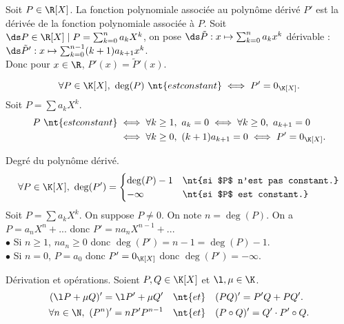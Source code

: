 \documentclass[11pt]{article}
\begin{document}
\begin{prop}{}{}
    Soit $P\in\R[X]$. La fonction polynomiale associée au polynôme dérivé $P'$ est la dérivée de la fonction polynomiale associée à $P$.
    \tcblower
    Soit $\ds P\in\R[X]\mid P=\sum_{k=0}^na_kX^k$, on pose $\ds\tilde{P}:x\mapsto \sum_{k=0}^na_kx^k$ dérivable : $\ds\tilde{P}':x\mapsto\sum_{k=0}^{n-1}(k+1)a_{k+1}x^k$.\\
    Donc pour $x\in\R$, $P'(x)=\tilde{P}'(x)$.
\end{prop}

\begin{prop}{}{}
    \begin{equation*}
        \forall P \in \K[X], ~ \deg(P)~\nt{est constant} \iff P' = 0_{\K[X]}.
    \end{equation*}
    \tcblower
    Soit $P=\sum a_kX^k$.
    \begin{align*}
        P~\nt{est constant} &\iff \forall k \geq 1, ~ a_k = 0 \iff \forall k \geq 0, ~ a_{k+1}=0\\
        &\iff \forall k \geq 0, ~ (k+1)a_{k+1}=0 \iff P'=0_{\K[X]}.
    \end{align*}
\end{prop}

\vspace*{-0.3cm}

\begin{prop}{Degré du polynôme dérivé.}{}
    \begin{equation*}
        \forall P \in \K[X], ~ \deg(P')=\begin{cases}\deg(P)-1 &\nt{si $P$ n'est pas constant.}\\ -\infty &\nt{si $P$ est constant.}\end{cases}
    \end{equation*}
    \tcblower
    Soit $P=\sum a_kX^k$. On suppose $P\neq0$. On note $n=\deg(P)$. On a $P=a_nX^n+...$ donc $P'=na_nX^{n-1}+...$\\
    $\bullet$ Si $n\geq1$, $na_n\geq0$ donc $\deg(P')=n-1=\deg(P)-1$.\\
    $\bullet$ Si $n=0$, $P=a_0$ donc $P'=0_{\K[X]}$ donc $\deg(P')=-\infty$.
\end{prop}

\begin{prop}{Dérivation et opérations.}{}
    Soient $P,Q\in\K[X]$ et $\l,\mu\in\K$.
    \begin{align*}
        (\l P + \mu Q)' = \l P' + \mu Q' \quad &\nt{et} \quad (PQ)' = P'Q + PQ'.\\
        \forall n \in \N, ~ (P^n)'=nP'P^{n-1} \quad &\nt{et} \quad (P\circ Q)'=Q'\cdot P'\circ Q.
    \end{align*}
\end{prop}
\end{document}
